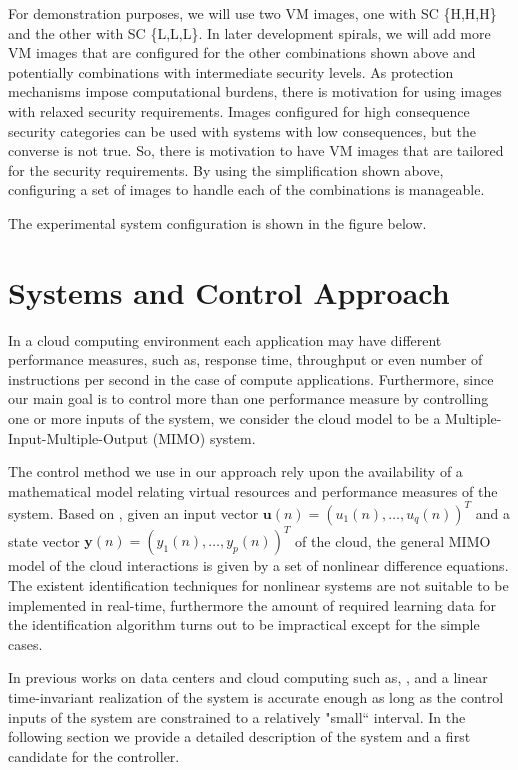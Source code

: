 \documentclass{acm_proc_article-sp}
\begin{document}
For demonstration purposes, we will use two VM images, one with SC \{H,H,H\} and the other with SC \{L,L,L\}.  In later development spirals, we will add more VM images that are configured  for the other combinations shown above and potentially combinations with intermediate security levels.  As protection mechanisms impose computational burdens, there is motivation for using images with relaxed security requirements. Images configured for high consequence security categories can be used with systems with low consequences, but the converse is not true.  So, there is motivation to have VM images that are tailored for the security requirements.  By using the simplification shown above, configuring a set of images to handle each of the combinations is manageable. 

The experimental system configuration is shown in the figure below.

\section{Systems and Control Approach}

In a cloud computing environment each application may have different performance measures, such as, response time, 
throughput or even number of instructions per second in the case of compute applications. Furthermore, since our main goal is
to control more than one performance measure by controlling one or more inputs of the system,
we consider the cloud model to be a Multiple-Input-Multiple-Output (MIMO) system.

The control method we use in our approach rely upon the availability of a mathematical model relating virtual resources
and performance measures of the system. Based on \cite{Nathuji-2010}, given an input vector 
$\mathbf{u}(n) = (u_{1}(n),\ldots,u_{q}(n))^{T}$ and a
state vector $\mathbf{y}(n) = (y_{1}(n),\ldots,y_{p}(n))^{T}$ of the cloud, the general MIMO
model of the cloud interactions is given by a set of nonlinear difference equations. The existent identification 
techniques for nonlinear systems are not suitable to be implemented in real-time, furthermore the amount of required
learning data for the identification algorithm turns out to be impractical except for the simple cases.

In previous works on data centers and cloud computing such as, \cite{Nathuji-2010},\cite{Yao-ACC-2010} and \cite{Luna-2011b}
a linear time-invariant realization of the system is accurate enough as long as the control inputs of the system are
constrained to a relatively "small`` interval. In the following section we provide a detailed description of the system
and a first candidate for the controller.
\end{document}
